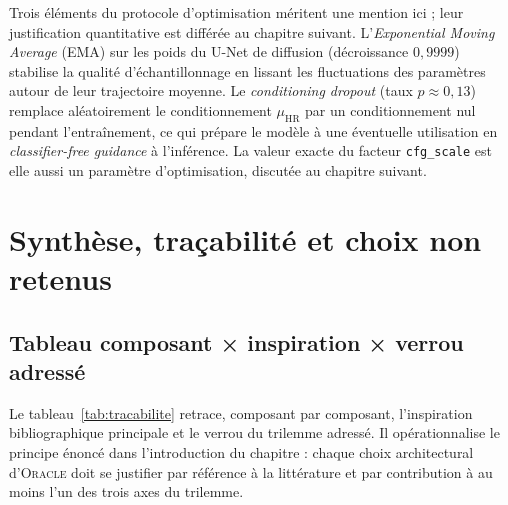 \documentclass[14pt,a4paper,openany]{extreport}
\theoremstyle{definition}
\newcommand{\Oracle}{\textsc{Oracle}}
\newcommand{\HR}{\ensuremath{\text{HR}}}
\newcommand{\muHR}{\ensuremath{\mu_{\HR}}}
\begin{document}
Trois éléments du protocole d'optimisation méritent une mention ici ; leur justification quantitative est différée au chapitre suivant. L'\emph{Exponential Moving Average} (EMA) sur les poids du U-Net de diffusion (décroissance $0{,}9999$) stabilise la qualité d'échantillonnage en lissant les fluctuations des paramètres autour de leur trajectoire moyenne. Le \emph{conditioning dropout} (taux $p \approx 0{,}13$) remplace aléatoirement le conditionnement $\muHR$ par un conditionnement nul pendant l'entraînement, ce qui prépare le modèle à une éventuelle utilisation en \emph{classifier-free guidance} à l'inférence. La valeur exacte du facteur \texttt{cfg\_scale} est elle aussi un paramètre d'optimisation, discutée au chapitre suivant.

\section{Synthèse, traçabilité et choix non retenus}
\label{sec:oracle-synthese}

\subsection{Tableau composant × inspiration × verrou adressé}
\label{ssec:oracle-tab-tracabilite}

Le tableau~\ref{tab:tracabilite} retrace, composant par composant, l'inspiration bibliographique principale et le verrou du trilemme adressé. Il opérationnalise le principe énoncé dans l'introduction du chapitre : chaque choix architectural d'\Oracle{} doit se justifier par référence à la littérature et par contribution à au moins l'un des trois axes du trilemme.
\end{document}
